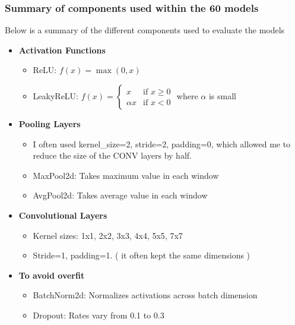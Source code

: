 \documentclass[conference]{IEEEtran}
\begin{document}
\subsubsection{Summary of components used within the 60 models}
Below is a summary of the different components used to evaluate the models
\begin{itemize}
    \item \textbf{Activation Functions}
          \begin{itemize}
              \item ReLU: $f(x) = \max(0,x)$
              \item LeakyReLU: $f(x) = \begin{cases} x & \text{if } x \geq 0 \\ \alpha x & \text{if } x < 0 \end{cases}$ where $\alpha$ is small
          \end{itemize}

    \item \textbf{Pooling Layers}
          \begin{itemize}
              \item I often used kernel\_size=2, stride=2, padding=0, which allowed me to reduce the size of the CONV layers by half.
              \item MaxPool2d: Takes maximum value in each window
              \item AvgPool2d: Takes average value in each window
          \end{itemize}

    \item \textbf{Convolutional Layers}
          \begin{itemize}
              \item Kernel sizes: 1x1, 2x2, 3x3, 4x4, 5x5, 7x7
              \item Stride=1, padding=1. ( it often kept the same dimensions )
          \end{itemize}

    \item \textbf{To avoid overfit}
          \begin{itemize}
              \item BatchNorm2d: Normalizes activations across batch dimension
              \item Dropout: Rates vary from 0.1 to 0.3
          \end{itemize}


\end{itemize}
\end{document}
